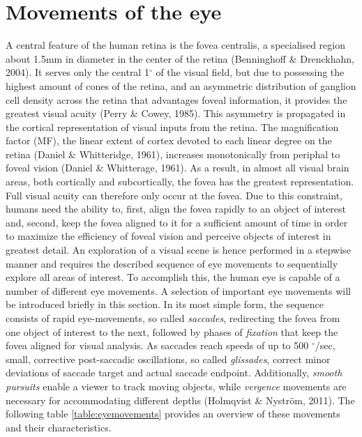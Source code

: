 \documentclass[a4paper, 11pt]{scrreprt}
\begin{document}
\section{Movements of the eye}
A central feature of the human retina is the fovea centralis, a specialised region about 1.5mm in diameter in the center of the retina (Benninghoff \& Drenckhahn, 2004). It serves only the central 1$^\circ$ of the visual field, but due to possessing the highest amount of cones of the retina, and an asymmetric distribution of ganglion cell density across the retina that advantages foveal information, it provides the greatest visual acuity (Perry \& Cowey, 1985). This asymmetry is propagated in the cortical representation of visual inputs from the retina. The magnification factor (MF), the linear extent of cortex devoted to each linear degree on the retina (Daniel \& Whitteridge, 1961), increases monotonically from periphal to foveal vision (Daniel \& Whitterage, 1961). As a result, in almost all visual brain areas, both cortically and subcortically, the fovea has the greatest representation. Full visual acuity can therefore only occur at the fovea. 
Due to this constraint, humans need the ability to, first, align the fovea rapidly to an object of interest and, second, keep the fovea aligned to it for a sufficient amount of time in order to maximize the efficiency of foveal vision and perceive objects of interest in greatest detail. An exploration of a visual scene is hence performed in a stepwise manner and requires the described sequence of eye movements to sequentially explore all areas of interest. To accomplish this, the human eye is capable of a number of different eye movements. A selection of important eye movements will be introduced briefly in this section. \newline
In its most simple form, the sequence consists of rapid eye-movements, so called \textit{saccades}, redirecting the fovea from one object of interest to the next, followed by phases of \textit{fixation} that keep the fovea aligned for visual analysis. As saccades reach speeds of up to 500 $^\circ$/sec, small, corrective post-saccadic oscillations, so called \textit{glissades}, correct minor deviations of saccade target and actual saccade endpoint. Additionally, \textit{smooth pursuits} enable a viewer to track moving objects, while \textit{vergence} movements are necessary for accommodating different depths (Holmqvist \& Nyström, 2011). The following table \ref{table:eyemovements} provides an overview of these movements and their characteristics. 
  
\end{document}
